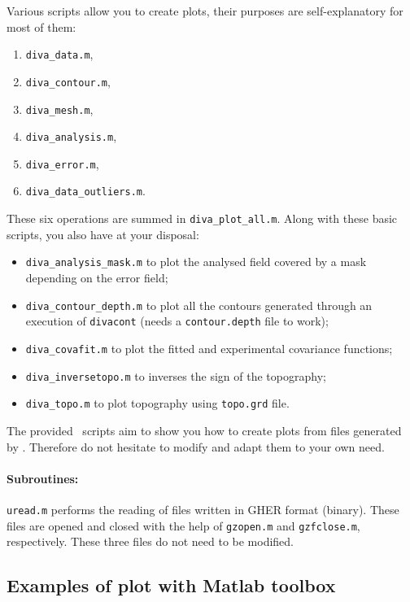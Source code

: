 Various scripts allow you to create plots, their purposes are self-explanatory for most of them:

\begin{enumerate}
\item \texttt{diva\_data.m},
\item \texttt{diva\_contour.m}, 
\item \texttt{diva\_mesh.m},
\item \texttt{diva\_analysis.m},
\item \texttt{diva\_error.m},
\item \texttt{diva\_data\_outliers.m}.
\end{enumerate}
\vspace{.25cm}

These six operations are summed in \texttt{diva\_plot\_all.m}. Along with these basic scripts, you also have at your disposal:
\begin{itemize}
\item \texttt{diva\_analysis\_mask.m} to plot the analysed field covered by a mask depending on the error field;
\item \texttt{diva\_contour\_depth.m} to plot all the contours generated through an execution of \texttt{divacont} (needs a \texttt{contour.depth} file to work);
\item \texttt{diva\_covafit.m} to plot the fitted and experimental covariance functions;
\item \texttt{diva\_inversetopo.m} to inverses the sign of the topography;
\item \texttt{diva\_topo.m} to plot topography using \texttt{topo.grd} file.
\end{itemize}

 
\btips
The provided \matlab\, scripts aim to show you how to create plots from files generated by \diva. Therefore do not hesitate to modify and adapt them to your own need.
\etips

\paragraph{Subroutines:} \texttt{uread.m} performs the reading of files written in GHER format (binary). These files are opened and closed with the help of \texttt{gzopen.m} and \texttt{gzfclose.m}, respectively. These three files do not need to be modified.


\subsection{Examples of plot with Matlab \diva toolbox}

